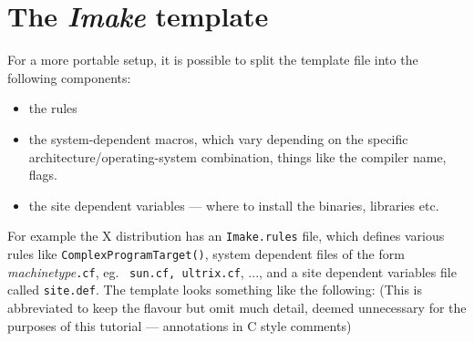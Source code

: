 \section{The {\em Imake} template}

For a more portable setup, it is possible to split the template file
into the following components:
\begin{itemize}
\item the rules
\item the system-dependent macros, which vary depending on the
        specific architecture/operating-system combination, things
        like the compiler name, flags.
\item the site dependent variables --- where to install the
        binaries, libraries etc.
\end{itemize}

For example the X distribution has an {\tt Imake.rules} file, which
defines various rules like {\tt ComplexProgramTarget()}, system
dependent files of the form {\em machinetype}{\tt .cf}, eg. {\tt
sun.cf, ultrix.cf}, ..., and a site dependent variables file called
{\tt site.def}. The template looks something like the following: (This
is abbreviated to keep the flavour but omit much detail, deemed
unnecessary for the purposes of this tutorial --- annotations in C
style comments)


